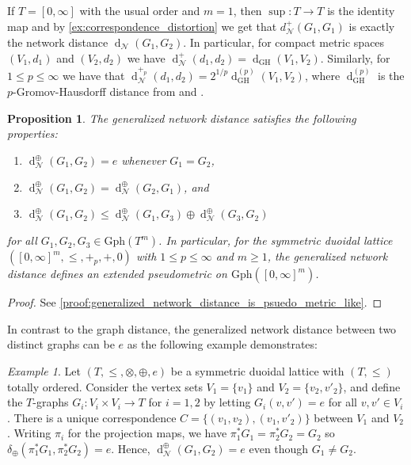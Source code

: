 \documentclass[a4paper,11pt]{article}
\newcommand{\Gph}{\mathrm{Gph}}
\newcommand{\tensor}{\otimes}
\newcommand{\atensor}{\oplus}
\DeclareMathOperator{\supa}{sup}
\newcounter{dummy}\numberwithin{dummy}{section}
\newtheorem{proposition}[dummy]{Proposition}
\theoremstyle{remark}
\newtheorem{example}[dummy]{Example}
\begin{document}
If $T=[0,\infty]$ with the usual order and $m=1$, then $\supa:T\to T$ is the identity map and by \cref{ex:correspondence_distortion} we get that $d^+_\mathcal{N}(G_1,G_1)$ is exactly the network distance $\operatorname{d}_\mathcal{N}(G_1,G_2)$. In particular, for compact metric spaces $(V_1,d_1)$ and $(V_2,d_2)$ we have $\operatorname{d}^+_\mathcal{N}(d_1,d_2)=\operatorname{d}_{\textrm{GH}}(V_1,V_2)$. Similarly, for $1\leq p \leq \infty$ we have that $\operatorname{d}^{+_p}_\mathcal{N}(d_1,d_2)=2^{1/p} \operatorname{d}_{\textrm{GH}}^{(p)}(V_1,V_2)$, where $\operatorname{d}_{\textrm{GH}}^{(p)}$ is the $p$-Gromov-Hausdorff distance from \cite{memoli2021gromov} and \cite{memoli2022metric}.


\begin{proposition}\label{lem:generalized_network_distance_is_psuedo_metric_like}
The generalized network distance satisfies the following properties:
\begin{enumerate}
    \item $\operatorname{d}^\atensor_{\mathcal{N}}(G_1,G_2)=e$ whenever $G_1=G_2$,
    \item $\operatorname{d}^\atensor_{\mathcal{N}}(G_1,G_2)=\operatorname{d}^\atensor_{\mathcal{N}}(G_2,G_1)$, and
    \item $\operatorname{d}^\atensor_{\mathcal{N}}(G_1,G_2)\leq\operatorname{d}^\atensor_{\mathcal{N}}(G_1,G_3)\atensor\operatorname{d}^\atensor_{\mathcal{N}}(G_3,G_2)$
\end{enumerate}
for all $G_1,G_2,G_3\in\Gph(T^m)$. In particular, for the symmetric duoidal lattice $([0,\infty]^m,\leq,+_p,+,0)$ with $1\leq p\leq\infty$ and $m\geq 1$, the generalized network distance defines an extended pseudometric on $\Gph([0,\infty]^m)$.
\end{proposition}
\begin{proof}
See \cref{proof:generalized_network_distance_is_psuedo_metric_like}.
\end{proof}


In contrast to the graph distance, the generalized network distance between two distinct graphs can be $e$ as the following example demonstrates:
\begin{example}
Let $(T,\leq,\tensor,\atensor,e)$ be a symmetric duoidal lattice with $(T,\leq)$ totally ordered. Consider the vertex sets $V_1=\{v_1\}$ and $V_2=\{v_2,v'_2\}$, and define the $T$-graphs $G_i\colon V_i\times V_i\to T$ for $i=1,2$ by letting $G_i(v,v')=e$ for all $v,v'\in V_i$. There is a unique correspondence $C=\{(v_1,v_2),(v_1,v'_2)\}$ between $V_1$ and $V_2$. Writing $\pi_i$ for the projection maps, we have $\pi_1^*G_1=\pi_2^*G_2=G_2$ so $\delta_\atensor(\pi_1^*G_1,\pi_2^*G_2)=e$. Hence, $\operatorname{d}_\mathcal{N}^\atensor(G_1,G_2)=e$ even though $G_1\neq G_2$.
\end{example}
\end{document}
